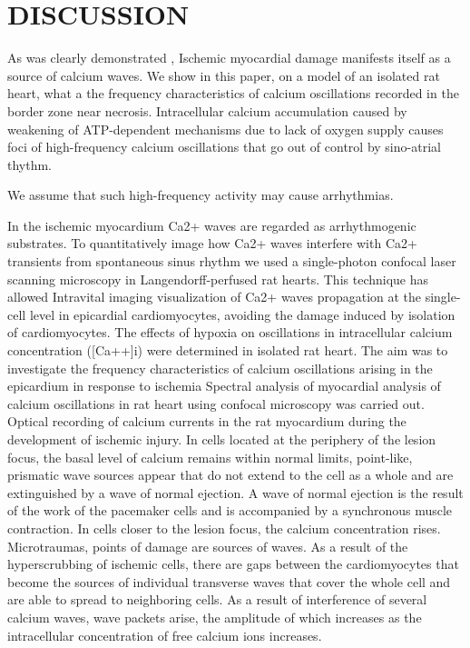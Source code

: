 \documentclass[a4paper,12pt]{article}
\begin{document}
\section{DISCUSSION}
As was clearly demonstrated \cite{matsuura2018intravital},
Ischemic myocardial damage manifests itself as a source of calcium waves.
We show in this paper, on a model of an isolated rat heart, what a the frequency characteristics of calcium oscillations recorded in the border zone near necrosis.
Intracellular calcium accumulation caused by weakening of ATP-dependent mechanisms due to lack of oxygen supply causes foci of high-frequency calcium oscillations that go out of control by sino-atrial thythm.

We assume that such high-frequency activity may cause arrhythmias.

In the ischemic myocardium Ca2+ waves are regarded as arrhythmogenic substrates.
To quantitatively image how Ca2+ waves interfere with Ca2+ transients from spontaneous sinus rhythm we used a single-photon confocal laser scanning microscopy in Langendorff-perfused rat hearts.
This technique has allowed Intravital imaging visualization of Ca2+ waves propagation at the single-cell level in epicardial cardiomyocytes, avoiding the damage induced by isolation of cardiomyocytes.
The effects of hypoxia on oscillations in intracellular calcium concentration ([Ca++]i) were determined in isolated rat heart.
The aim was to investigate the frequency characteristics of calcium oscillations arising in the epicardium in response to ischemia
Spectral  analysis of myocardial analysis of calcium oscillations in rat heart using confocal microscopy was carried out.
Optical recording of calcium currents in the rat myocardium during the development of ischemic injury.
In cells located at the periphery of the lesion focus, the basal level of calcium remains within normal limits, point-like, prismatic wave sources appear that do not extend to the cell as a whole and are extinguished by a wave of normal ejection.
A wave of normal ejection is the result of the work of the pacemaker cells and is accompanied by a synchronous muscle contraction.
In cells closer to the lesion focus, the calcium concentration rises.
Microtraumas, points of damage are sources of waves.
As a result of the hyperscrubbing of ischemic cells, there are gaps between the cardiomyocytes that become the sources of individual transverse waves that cover the whole cell and are able to spread to neighboring cells.
As a result of interference of several calcium waves, wave packets arise, the amplitude of which increases as the intracellular concentration of free calcium ions increases.
\end{document}
